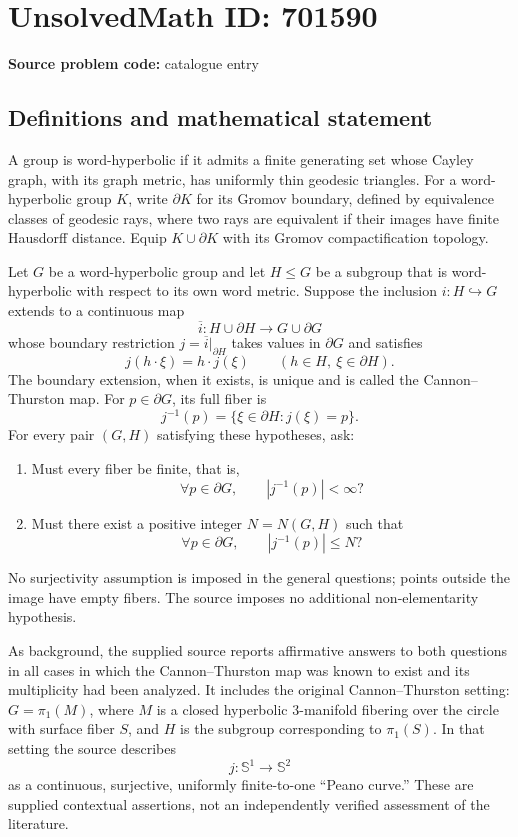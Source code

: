 \documentclass[11pt]{article}
\begin{document}
\section*{UnsolvedMath ID: 701590}
\textbf{Source problem code:} catalogue entry
\subsection{Definitions and mathematical statement}
A group is word-hyperbolic if it admits a finite generating set whose Cayley graph, with its graph metric, has uniformly thin geodesic triangles. For a word-hyperbolic group \(K\), write \(\partial K\) for its Gromov boundary, defined by equivalence classes of geodesic rays, where two rays are equivalent if their images have finite Hausdorff distance. Equip \(K\cup\partial K\) with its Gromov compactification topology.

Let \(G\) be a word-hyperbolic group and let \(H\leq G\) be a subgroup that is word-hyperbolic with respect to its own word metric. Suppose the inclusion \(i:H\hookrightarrow G\) extends to a continuous map
\[
\overline{i}:H\cup\partial H\longrightarrow G\cup\partial G
\]
whose boundary restriction \(j=\overline{i}|_{\partial H}\) takes values in \(\partial G\) and satisfies
\[
j(h\cdot\xi)=h\cdot j(\xi)\qquad(h\in H,\ \xi\in\partial H).
\]
The boundary extension, when it exists, is unique and is called the Cannon--Thurston map. For \(p\in\partial G\), its full fiber is
\[
j^{-1}(p)=\{\xi\in\partial H:j(\xi)=p\}.
\]
For every pair \((G,H)\) satisfying these hypotheses, ask:
\begin{enumerate}
\item[(a)] Must every fiber be finite, that is,
\[
\forall p\in\partial G,\qquad |j^{-1}(p)|<\infty?
\]
\item[(b)] Must there exist a positive integer \(N=N(G,H)\) such that
\[
\forall p\in\partial G,\qquad |j^{-1}(p)|\leq N?
\]
\end{enumerate}
No surjectivity assumption is imposed in the general questions; points outside the image have empty fibers. The source imposes no additional non-elementarity hypothesis.

As background, the supplied source reports affirmative answers to both questions in all cases in which the Cannon--Thurston map was known to exist and its multiplicity had been analyzed. It includes the original Cannon--Thurston setting: \(G=\pi_1(M)\), where \(M\) is a closed hyperbolic \(3\)-manifold fibering over the circle with surface fiber \(S\), and \(H\) is the subgroup corresponding to \(\pi_1(S)\). In that setting the source describes
\[
j:\mathbb{S}^1\longrightarrow\mathbb{S}^2
\]
as a continuous, surjective, uniformly finite-to-one ``Peano curve.'' These are supplied contextual assertions, not an independently verified assessment of the literature.
\end{document}
